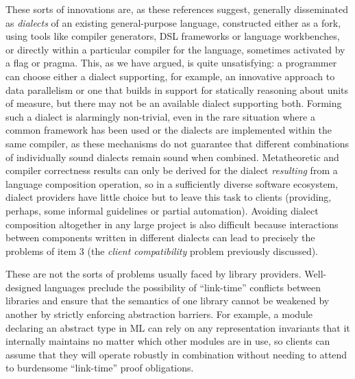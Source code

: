 These sorts of innovations are, as these references suggest, generally disseminated as \emph{dialects} of an existing general-purpose language, constructed either as a fork, using tools like compiler generators, DSL frame\-works or  language workbenches, or directly within a particular compiler for the language, sometimes activated by a flag or pragma. This, as we have argued, is quite unsatisfying: a programmer can choose either a dialect supporting, for example, an innovative approach to data parallelism or one that builds in support for statically reasoning about units of measure, but there may not be an available dialect supporting both. Forming such a dialect is alarmingly non-trivial, even in the rare situation where a common framework has been used or the dialects are implemented within the same compiler, as these mechanisms do not guarantee that different combinations of individually sound dialects remain sound when combined. Metatheoretic and compiler correctness results can only be derived for the dialect \emph{resulting} from a language   composition operation, so in a sufficiently diverse software ecosystem, dialect providers have little choice but to leave this task to clients (providing, perhaps, some informal guidelines or partial automation). Avoiding dialect composition altogether in any large project is also difficult because interactions between components written in different dialects can lead to precisely the problems of item 3 (the \emph{client compatibility} problem previously discussed).%

These are not the sorts of problems usually faced by library providers. Well-designed languages preclude the  possibility of ``link-time'' conflicts between libraries and ensure that the semantics of one library  cannot be weakened by another by strictly enforcing abstraction barriers. For example, a module declaring an abstract type in ML can rely on any representation invariants that it internally maintains no matter which other modules are in use, so clients can assume that they will operate robustly in combination without needing to attend to burdensome ``link-time'' proof obligations. 

